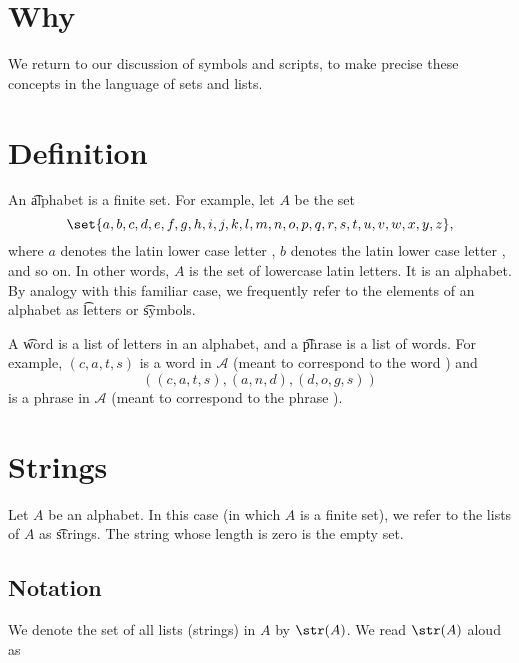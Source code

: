 

\section*{Why}

We return to our discussion of symbols and scripts, to make precise these concepts in the language of sets and lists.

\section*{Definition}

An \t{alphabet} is a finite set.
For example, let $A$ be the set
    \[
\set{a, b, c, d, e, f,g,h,i,j,k,l,m,n,o,p,q,r,s,t,u,v,w, x, y,z},
    \]
where $a$ denotes the latin lower case letter , $b$ denotes the latin lower case letter , and so on.
In other words, $A$ is the set of lowercase latin letters.
It is an alphabet.
By analogy with this familiar case, we frequently refer to the elements of an alphabet as \t{letters} or \t{symbols}.

A \t{word} is a list of letters in an alphabet, and a \t{phrase} is a list of words.
For example, $(c,a,t,s)$ is a word in $\mathcal{A} $ (meant to correspond to the word ) and
    \[
((c,a,t,s), (a,n,d), (d,o,g,s))
    \]
is a phrase in $\mathcal{A} $ (meant to correspond to the phrase ).

\section*{Strings}

Let $A$ be an alphabet.
In this case (in which $A$ is a finite set), we refer to the lists of $A$ as \t{strings}.
The string whose length is zero is the empty set.

\subsection*{Notation}

We denote the set of all lists (strings) in $A$ by $\str(A)$.
We read $\str(A)$ aloud as 
